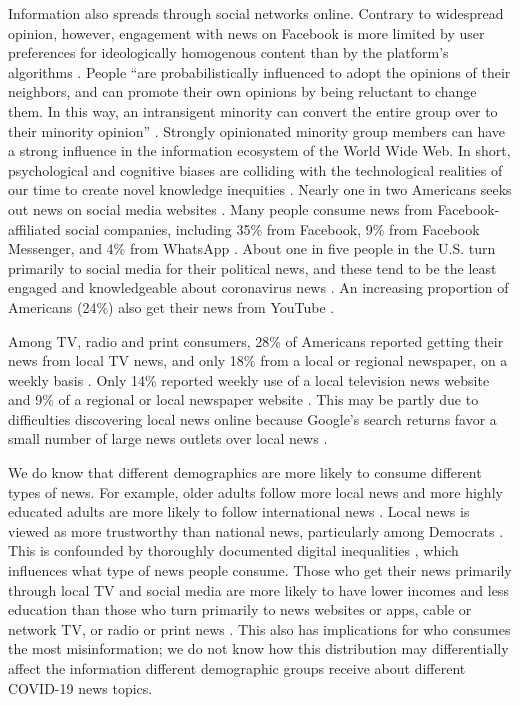 \documentclass[11pt]{article}
\begin{document}
Information also spreads through social networks online. Contrary to widespread opinion, however, engagement with news on Facebook is more limited by user preferences for ideologically homogenous content than by the platform's algorithms \citep{Bakshy2015}. People ``are probabilistically influenced to adopt the opinions of their neighbors, and can promote their own opinions by being reluctant to change them. In this way, an intransigent minority can convert the entire group over to their minority opinion'' \citep{West2011}. Strongly opinionated minority group members can have a strong influence in the information ecosystem of the World Wide Web. In short, psychological and cognitive biases \citep{DiMaggio1997} are colliding with the technological realities of our time to create novel knowledge inequities \citep{Mohammed2012}. Nearly one in two Americans seeks out news on social media websites \citep{Reuters2020}. Many people consume news from Facebook-affiliated social companies, including 35\% from Facebook, 9\% from Facebook Messenger, and 4\% from WhatsApp \citep[87]{Reuters2020}. About one in five people in the U.S. turn primarily to social media for their political news, and these tend to be the least engaged and knowledgeable about coronavirus news \citep{Mitchell2020a}. An increasing proportion of Americans (24\%) also get their news from YouTube \cite{Shearer2017,Reuters2020}.

Among TV, radio and print consumers, 28\% of Americans reported getting their news from local TV news, and only 18\% from a local or regional newspaper, on a weekly basis \citep{Reuters2020}. Only 14\% reported weekly use of a local television news website and 9\% of a regional or local newspaper website \citep{Reuters2020}. This may be partly due to difficulties discovering local news online because Google's search returns favor a small number of large news outlets over local news \citep{Diakopoulos2019,Fischer2020}.

We do know that different demographics are more likely to consume different types of news. For example, older adults follow more local news and more highly educated adults are more likely to follow international news \citep{Mitchell2018}. Local news is viewed as more trustworthy than national news, particularly among Democrats \citep{KnightGallup2019,Reuters2020}. This is confounded by thoroughly documented digital inequalities \citep{Robinson2020a}, which influences what type of news people consume. Those who get their news primarily through local TV and social media are more likely to have lower incomes and less education than those who turn primarily to news websites or apps, cable or network TV, or radio or print news \citep{Mitchell2020a}. This also has implications for who consumes the most misinformation; we do not know how this distribution may differentially affect the information different demographic groups receive about different COVID-19 news topics.
\end{document}
